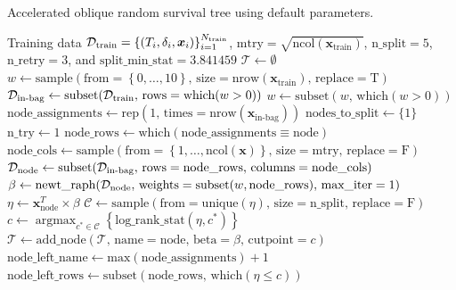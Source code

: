 \documentclass[12pt]{article}\usepackage[]{graphicx}\usepackage[]{xcolor}
\DeclareMathOperator*{\argmax}{argmax}
\newcommand{\dataset}{{\cal D}}
\begin{document}
\begin{algorithm}
    \caption{Accelerated oblique random survival tree using default parameters.} \label{alg:aorsf}
  \begin{algorithmic}[1]
    \Require Training data $\dataset_{\text{train}} = \left\{ (T_i, \delta_i, \bm{x}_{i}) \right\}_{i=1}^{N_{\text{train}}}$, $\text{mtry} = \sqrt{\text{ncol}(\bm{x}_{\text{train}})}$, $\text{n\_split} = 5$, $\text{n\_retry} = 3$, and $\text{split\_min\_stat} = 3.841459$
    \State $\mathcal{T} \gets \emptyset$
    \State $w \gets \text{sample}(\text{from} = \left\{0, \ldots, 10\right\},\,\text{size} = \text{nrow}(\bm{x}_{\text{train}}),\, \text{replace} = \text{T})$
    \State $\dataset_{\text{in-bag}} \gets \text{subset}(\dataset_{\text{train}},\,\text{rows} = \text{which}(w > 0))$
    \State $w \gets \text{subset}(w,\, \text{which}(w > 0))$
    \State $\text{node\_assignments} \gets \text{rep}(1,\,\text{times} = \text{nrow}(\bm{x}_{\text{in-bag}}))$
    \State $\text{nodes\_to\_split} \gets \{1\}$
       \State $\text{n\_try} \gets 1$
       \State $\text{node\_rows} \gets \text{which}(\text{node\_assignments} \equiv \text{node})$
       \State $\text{node\_cols} \gets \text{sample}(\text{from} = \left\{1, \ldots, \text{ncol}(\bm{x})\right\},\, \text{size} = \text{mtry},\,\text{replace} = \text{F})$ \label{marker}
       \State $\dataset_{\text{node}} \gets \text{subset}(\dataset_{\text{in-bag}},\,\text{rows} = \text{node\_rows},\,\text{columns} = \text{node\_cols})$
       \State $\beta \gets \text{newt\_raph}(\dataset_{\text{node}},\, \text{weights} = \text{subset}(w, \text{node\_rows}),\, \text{max\_iter} = 1)$
       \State $\eta \gets \bm{x}^T_{\text{node}} \times \beta$
       \State $\mathcal{C} \gets \text{sample}(\text{from} = \text{unique}(\eta),\, \text{size} = \text{n\_split},\,\text{replace} = \text{F})$
       \State $c \gets \argmax_{c^* \in \mathcal{C}} \left\{ \text{log\_rank\_stat}(\eta, c^*) \right\}$
         \State $\mathcal{T} \gets \text{add\_node}(\mathcal{T},\, \text{name} = \text{node},\, \text{beta} = \beta,\, \text{cutpoint} = c)$
         \State {}
         \State $\text{node\_left\_name} \gets \text{max}(\text{node\_assignments}) + 1$
         \State $\text{node\_left\_rows} \gets \text{subset}(\text{node\_rows},\,\text{which}(\eta \leq c))$

\end{algorithmic}
\end{algorithm}
\end{document}
